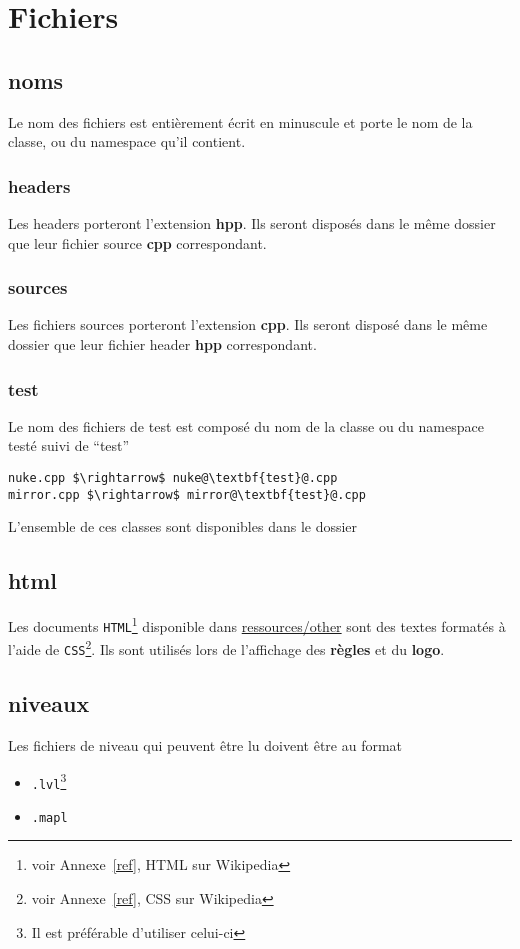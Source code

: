 \documentclass[a4paper,11pt]{report}
\begin{document}
\section{Fichiers}
\subsection{noms}
Le nom des fichiers est entièrement écrit en minuscule et porte le nom de la
classe, ou du namespace qu'il contient.
\subsubsection{headers}
Les headers porteront l'extension \textbf{hpp}. Ils seront disposés dans le même
dossier que leur fichier source \textbf{cpp} correspondant.
\subsubsection{sources}
Les fichiers sources porteront l'extension \textbf{cpp}. Ils seront disposé dans
le même dossier que leur fichier header \textbf{hpp} correspondant.
\subsubsection{test}
Le nom des fichiers de test est composé du nom de la classe ou du namespace
testé suivi de ``test''
\begin{lstlisting}[frame=single, mathescape, escapechar=@]
nuke.cpp $\rightarrow$ nuke@\textbf{test}@.cpp 
mirror.cpp $\rightarrow$ mirror@\textbf{test}@.cpp
\end{lstlisting}
L'ensemble de ces classes sont disponibles dans le dossier 

\subsection{html}
Les documents \texttt{HTML}\footnote{voir Annexe~\ref{ref}, HTML sur Wikipedia} 
disponible dans \url{ressources/other} sont des textes
formatés à l'aide de \texttt{CSS}\footnote{voir Annexe~\ref{ref}, CSS sur Wikipedia}. 
Ils sont utilisés lors de l'affichage des
\textbf{règles} et du \textbf{logo}.
\subsection{niveaux}
Les fichiers de niveau qui peuvent être lu doivent être au format 
\begin{itemize}
	\item \texttt{.lvl}\footnote{Il est préférable d'utiliser celui-ci}
	\item \texttt{.mapl}
\end{itemize}
\end{document}
